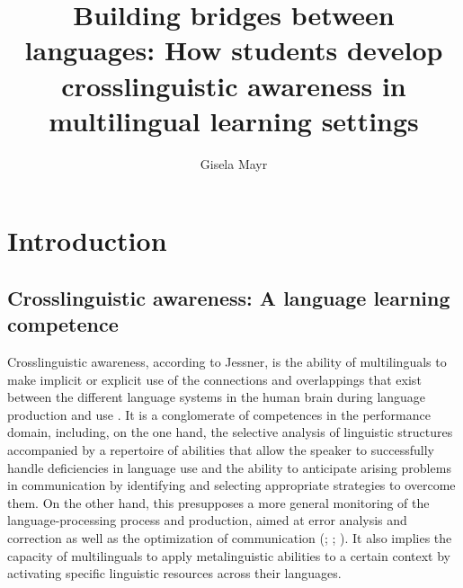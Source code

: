 \documentclass[output=paper]{../langscibook}
\author{Gisela Mayr\affiliation{Free University of Bolzano}\orcid{}}
\title{Building bridges between languages: How students develop crosslinguistic awareness in multilingual learning settings}
\begin{document}
\maketitle 
{}%




\section{Introduction}

\subsection{Crosslinguistic awareness: A language learning competence}

Crosslinguistic awareness, according to Jessner, is the ability of multilinguals to make implicit or explicit use of the connections and overlappings that exist between the different language systems in the human brain during language production and use \citep[116]{Jessner2006}. It is a conglomerate of competences in the performance domain, including, on the one hand, the selective analysis of linguistic structures accompanied by a repertoire of abilities that allow the speaker to successfully handle deficiencies in language use and the ability to anticipate arising problems in communication by identifying and selecting appropriate strategies to overcome them. On the other hand, this presupposes a more general monitoring of the language-processing process and production, aimed at error analysis and correction as well as the optimization of communication (\citealt{LuoEtAl2010}; \citealt{DeAngelisDewaele2011}; \citealt{HerdinaJessner2002b}). It also implies the capacity of multilinguals to apply metalinguistic abilities to a certain context by activating specific linguistic resources across their languages. 
\end{document}
